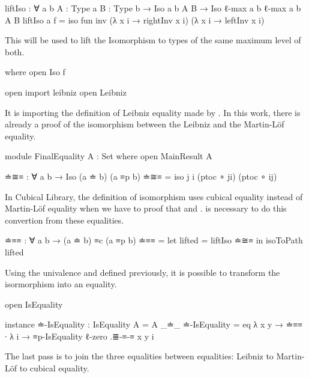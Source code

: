 \documentclass{article}
\begin{document}
\begin{code}
liftIso : ∀ {a b} {A : Type a} {B : Type b}
  → Iso {a} {b} A B → Iso {ℓ-max a b} {ℓ-max a b} A B
liftIso {a} f = iso fun inv
  (λ x i → rightInv x i) (λ x i → leftInv x i)
\end{code}

This  will be used to lift the Isomorphism to types of the same maximum level of both.

\begin{code}
  where open Iso f

open import leibniz
open Leibniz
\end{code}

It is importing the definition of Leibniz equality made by \cite{abel2020leibniz}.
In this work, there is already a proof of the isomorphism between the Leibniz and the Martin-Löf equality.

\begin{code}
module FinalEquality {A : Set} where
  open MainResult A

  ≐≅≡ : ∀ {a b} → Iso (a ≐ b) (a ≡p b)
  ≐≅≡ = iso j i (ptoc ∘ ji) (ptoc ∘ ij)
\end{code}

In Cubical Library, the definition of isomorphism uses cubical equality instead of Martin-Löf equality
when we have to proof that  and .
 is necessary to do this convertion from these equalities.

\begin{code}
  ≐≡≡ : ∀ {a b} → (a ≐ b) ≡c (a ≡p b)
  ≐≡≡ = let lifted = liftIso ≐≅≡  in isoToPath lifted
\end{code}

Using the univalence and  defined previously, it is possible to transform the isormorphism
into an equality.

\begin{code}
  open IsEquality

  instance
    ≐-IsEquality : IsEquality {A = A} _≐_
    ≐-IsEquality = eq λ {x} {y} → ≐≡≡ ∙
      λ i → ≡p-IsEquality {ℓ-zero} .≣-≡-≡ {x} {y} i
\end{code}

The last pass is to join the three equalities between equalities:
Leibniz to Martin-Löf to cubical equality.
\end{document}
